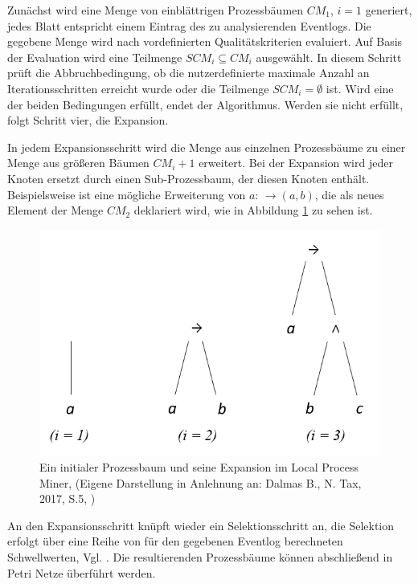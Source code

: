 Zunächst wird eine Menge von einblättrigen Prozessbäumen $CM_1$, $i=1$ generiert, jedes Blatt entspricht einem Eintrag des zu analysierenden Eventlogs. Die gegebene Menge wird nach vordefinierten Qualitätskriterien evaluiert. Auf Basis der Evaluation wird eine Teilmenge $SCM_i \subseteq CM_i$ ausgewählt. In diesem Schritt prüft die Abbruchbedingung, ob die nutzerdefinierte maximale Anzahl an Iterationsschritten erreicht wurde oder die Teilmenge $SCM_i=∅$  ist. Wird eine der beiden Bedingungen erfüllt, endet der Algorithmus. Werden sie nicht erfüllt, folgt Schritt vier, die Expansion. 

In jedem Expansionsschritt wird die Menge aus einzelnen Prozessbäume zu einer Menge aus größeren Bäumen $CM_i+1$ erweitert. Bei der Expansion wird jeder Knoten ersetzt durch einen Sub-Prozessbaum, der diesen Knoten enthält. Beispielsweise ist eine mögliche Erweiterung von $a$: $ →(a,b)$, die als neues Element der Menge $CM_2$ deklariert wird, wie in Abbildung \ref{fig:lpmExample} zu sehen ist. 
\begin{figure}[!h]
    \centering
    \includegraphics[scale=0.45]{figures/Appbildungen/lpm_example.PNG}
    \caption{Ein initialer Prozessbaum und seine Expansion im Local Process Miner, (Eigene Darstellung in Anlehnung an: Dalmas B., N. Tax, 2017, S.5, \cite{lpm}) }
    \label{fig:lpmExample}
\end{figure}

An den Expansionsschritt knüpft wieder ein Selektionsschritt an, die Selektion erfolgt über eine Reihe von für den gegebenen Eventlog berechneten Schwellwerten, Vgl. \cite{lpm}. Die resultierenden Prozessbäume können abschließend in Petri Netze überführt werden.

